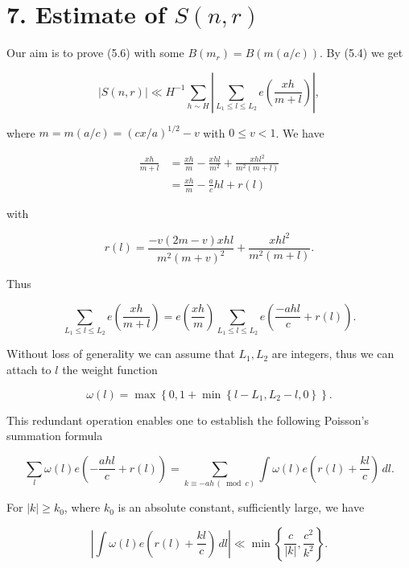 \documentclass[10pt]{article}
\begin{document}
\section*{7. Estimate of $S(n, r)$}
Our aim is to prove (5.6) with some $B\left(m_{r}\right)=B(m(a / c))$. By (5.4) we get

$$
|S(n,r)|\ll H^{-1} \sum_{h \sim H}\left|\sum_{L_{1} \leqslant l \leqslant L_{2}} e\left(\frac{x h}{m+l}\right)\right|,
$$

where $m=m(a / c)=(c x / a)^{1 / 2}-v$ with $0 \leqslant v<1$. We have

$$
\begin{aligned}
\frac{x h}{m+l} & =\frac{x h}{m}-\frac{x h l}{m^{2}}+\frac{x h l^{2}}{m^{2}(m+l)} \\
& =\frac{x h}{m}-\frac{a}{c} h l+r(l)
\end{aligned}
$$

with


\begin{equation*}
r(l)=\frac{-v(2 m-v) x h l}{m^{2}(m+v)^{2}}+\frac{x h l^{2}}{m^{2}(m+l)} . \tag{7.1}
\end{equation*}


Thus

$$
\sum_{L_{1} \leqslant l \leqslant L_{2}} e\left(\frac{x h}{m+l}\right)=e\left(\frac{x h}{m}\right) \sum_{L_{1} \leqslant l \leqslant L_{2}} e\left(\frac{-a h l}{c}+r(l)\right) .
$$

Without loss of generality we can assume that $L_{1}, L_{2}$ are integers, thus we can attach to $l$ the weight function

$$
\omega(l)=\max \left\{0,1+\min \left\{l-L_{1}, L_{2}-l, 0\right\}\right\} .
$$

This redundant operation enables one to establish the following Poisson's summation formula


\begin{equation*}
\sum_{l}\omega(l)e\left(-\frac{ahl}{c}+r(l)\right)
=\sum_{k\equiv-ah\, (\bmod c)}\int \omega(l)e\left(r(l)+\frac{kl}{c}\right)\,dl. \tag{7.2}
\end{equation*}


For $|k| \geqslant k_{0}$, where $k_{0}$ is an absolute constant, sufficiently large, we have


\begin{equation*}
\left|\int \omega(l)e\left(r(l)+\frac{kl}{c}\right)\,dl\right|\ll\min\left\{\frac{c}{|k|},\frac{c^{2}}{k^{2}}\right\} . \tag{7.3}
\end{equation*}
\end{document}
